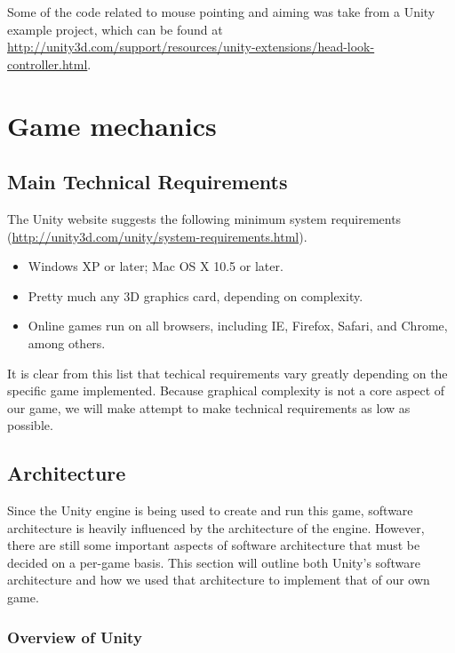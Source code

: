 \documentclass{article}
\begin{document}
Some of the code related to mouse pointing and aiming was take from a Unity example project, which can be found at \url{http://unity3d.com/support/resources/unity-extensions/head-look-controller.html}.

\section{Game mechanics}

\subsection{Main Technical Requirements}

The Unity website suggests the following minimum system requirements (\url{http://unity3d.com/unity/system-requirements.html}).

\begin{itemize}

\item {Windows XP or later; Mac OS X 10.5 or later.}
\item{Pretty much any 3D graphics card, depending on complexity.}
\item{Online games run on all browsers, including IE, Firefox, Safari, and Chrome, among others.}

\end{itemize}

It is clear from this list that techical requirements vary greatly depending on the specific game implemented.  Because graphical complexity is not a core aspect of our game, we will make attempt to make technical requirements as low as possible.

\label{Architecture}
\subsection{Architecture}

Since the Unity engine is being used to create and run this game, software architecture is heavily influenced by the architecture of the engine.  However, there are still some important aspects of software architecture that must be decided on a per-game basis.  This section will outline both Unity's software architecture and how we used that architecture to implement that of our own game.

\subsubsection{Overview of Unity}
\end{document}
